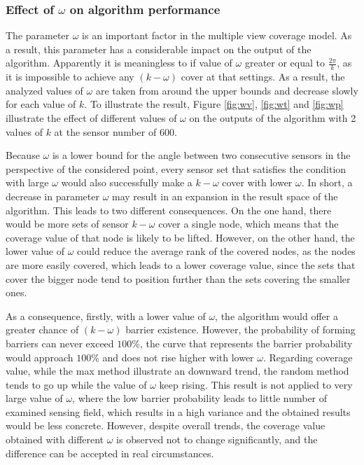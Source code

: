 \subsubsection{Effect of $\omega$ on algorithm performance}

The parameter $\omega$ is an important factor in the multiple view coverage model. As a result, this parameter has a considerable impact on the output of the algorithm. Apparently it is meaningless to if value of $\omega$ greater or equal to $\frac{2\pi}{k}$, as it is impossible to achieve any $(k-\omega)$ cover at that settings. As a result, the analyzed values of $\omega$ are taken from around the upper bounds and decrease slowly for each value of $k$. To illustrate the result, Figure \ref{fig:wv}, \ref{fig:wt} and \ref{fig:wp} illustrate the effect of different values of $\omega$ on the outputs of the algorithm with 2 values of $k$ at the sensor number of 600.

Because $\omega$ is a lower bound for the angle between two consecutive sensors in the perspective of the considered point, every sensor set that satisfies the condition with large $\omega$ would also successfully make a $k-\omega$ cover with lower $\omega$. In short, a decrease in parameter $\omega$ may result in an expansion in the result space of the algorithm. This leads to two different consequences. On the one hand, there would be more sets of sensor $k-\omega$ cover a single node, which means that the coverage value of that node is likely to be lifted. However, on the other hand, the lower value of $\omega$ could reduce the average rank of the covered nodes, as the nodes are more easily covered, which leads to a lower coverage value, since the sets that cover the bigger node tend to position further than the sets covering the smaller ones.

As a consequence, firstly, with a lower value of $\omega$, the algorithm would offer a greater chance of $(k-\omega)$ barrier existence. However, the probability of forming barriers can never exceed $100\%$, the curve that represents the barrier probability would approach $100\%$ and does not rise higher with lower $\omega$. Regarding coverage value, while the max method illustrate an downward trend, the random method tends to go up while the value of $\omega$ keep rising. This result is not applied to very large value of $\omega$, where the low barrier probability leads to little number of examined sensing field, which results in a high variance and the obtained results would be less concrete. However, despite overall trends, the coverage value obtained with different $\omega$ is observed not to change significantly, and the difference can be accepted in real circumstances.

